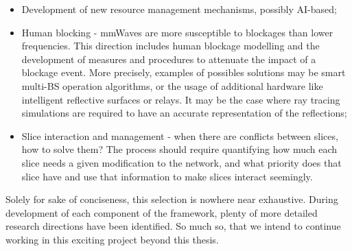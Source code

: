 \begin{itemize}
    \item Development of new resource management mechanisms, possibly AI-based;
    \item Human blocking - mmWaves are more susceptible to blockages than lower frequencies. This direction includes human blockage modelling and the development of measures and procedures to attenuate the impact of a blockage event. More precisely, examples of possibles solutions may be smart multi-BS operation algorithms, or the usage of additional hardware like intelligent reflective surfaces \cite{8936989} or relays. It may be the case where ray tracing simulations are required to have an accurate representation of the reflections;
    \item Slice interaction and management - when there are conflicts between slices, how to solve them? The process should require quantifying how much each slice needs a given modification to the network, and what priority does that slice have and use that information to make slices interact seemingly.
\end{itemize}

Solely for sake of conciseness, this selection is nowhere near exhaustive. During development of each component of the framework, plenty of more detailed research directions have been identified. So much so, that we intend to continue working in this exciting project beyond this thesis.



